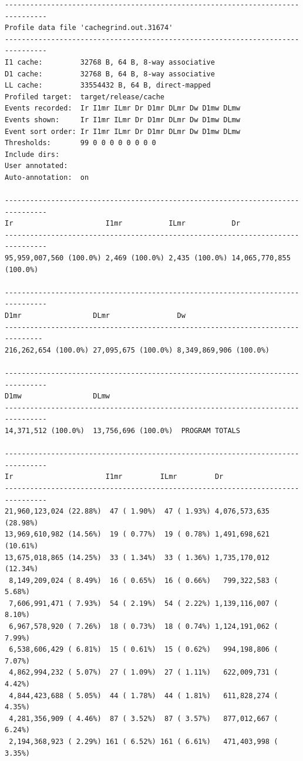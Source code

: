 \documentclass{article}
\begin{document}
\begin{verbatim}
--------------------------------------------------------------------------------
Profile data file 'cachegrind.out.31674'
--------------------------------------------------------------------------------
I1 cache:         32768 B, 64 B, 8-way associative
D1 cache:         32768 B, 64 B, 8-way associative
LL cache:         33554432 B, 64 B, direct-mapped
Profiled target:  target/release/cache
Events recorded:  Ir I1mr ILmr Dr D1mr DLmr Dw D1mw DLmw
Events shown:     Ir I1mr ILmr Dr D1mr DLmr Dw D1mw DLmw
Event sort order: Ir I1mr ILmr Dr D1mr DLmr Dw D1mw DLmw
Thresholds:       99 0 0 0 0 0 0 0 0
Include dirs:     
User annotated:   
Auto-annotation:  on

--------------------------------------------------------------------------------
Ir                      I1mr           ILmr           Dr                      
--------------------------------------------------------------------------------
95,959,007,560 (100.0%) 2,469 (100.0%) 2,435 (100.0%) 14,065,770,855 (100.0%) 

--------------------------------------------------------------------------------
D1mr                 DLmr                Dw                                     
-------------------------------------------------------------------------------              
216,262,654 (100.0%) 27,095,675 (100.0%) 8,349,869,906 (100.0%)  

--------------------------------------------------------------------------------
D1mw                 DLmw
--------------------------------------------------------------------------------
14,371,512 (100.0%)  13,756,696 (100.0%)  PROGRAM TOTALS

--------------------------------------------------------------------------------
Ir                      I1mr         ILmr         Dr                     
--------------------------------------------------------------------------------
21,960,123,024 (22.88%)  47 ( 1.90%)  47 ( 1.93%) 4,076,573,635 (28.98%) 
13,969,610,982 (14.56%)  19 ( 0.77%)  19 ( 0.78%) 1,491,698,621 (10.61%) 
13,675,018,865 (14.25%)  33 ( 1.34%)  33 ( 1.36%) 1,735,170,012 (12.34%) 
 8,149,209,024 ( 8.49%)  16 ( 0.65%)  16 ( 0.66%)   799,322,583 ( 5.68%) 
 7,606,991,471 ( 7.93%)  54 ( 2.19%)  54 ( 2.22%) 1,139,116,007 ( 8.10%) 
 6,967,578,920 ( 7.26%)  18 ( 0.73%)  18 ( 0.74%) 1,124,191,062 ( 7.99%) 
 6,538,606,429 ( 6.81%)  15 ( 0.61%)  15 ( 0.62%)   994,198,806 ( 7.07%) 
 4,862,994,232 ( 5.07%)  27 ( 1.09%)  27 ( 1.11%)   622,009,731 ( 4.42%) 
 4,844,423,688 ( 5.05%)  44 ( 1.78%)  44 ( 1.81%)   611,828,274 ( 4.35%) 
 4,281,356,909 ( 4.46%)  87 ( 3.52%)  87 ( 3.57%)   877,012,667 ( 6.24%) 
 2,194,368,923 ( 2.29%) 161 ( 6.52%) 161 ( 6.61%)   471,403,998 ( 3.35%) 



\end{verbatim}
\end{document}
